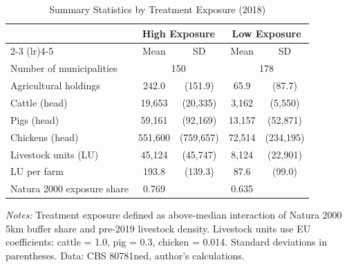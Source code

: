 \begin{table}[htbp]
\centering
\begin{threeparttable}
\caption{Summary Statistics by Treatment Exposure (2018)}
\label{tab:summary}
\small
\begin{tabular}{lcccc}
\toprule
 & \multicolumn{2}{c}{High Exposure} & \multicolumn{2}{c}{Low Exposure} \\
\cmidrule(lr){2-3} \cmidrule(lr){4-5}
 & Mean & SD & Mean & SD \\
\midrule
Number of municipalities & \multicolumn{2}{c}{150} & \multicolumn{2}{c}{178} \\
\addlinespace
Agricultural holdings & 242.0 & (151.9) & 65.9 & (87.7) \\
Cattle (head) & 19,653 & (20,335) & 3,162 & (5,550) \\
Pigs (head) & 59,161 & (92,169) & 13,157 & (52,871) \\
Chickens (head) & 551,600 & (759,657) & 72,514 & (234,195) \\
Livestock units (LU) & 45,124 & (45,747) & 8,124 & (22,901) \\
LU per farm & 193.8 & (139.3) & 87.6 & (99.0) \\
\addlinespace
Natura 2000 exposure share & 0.769 & & 0.635 & \\
\bottomrule
\end{tabular}
\begin{tablenotes}
\item \textit{Notes:} Treatment exposure defined as above-median interaction of Natura 2000 5km buffer share and pre-2019 livestock density. Livestock units use EU coefficients: cattle = 1.0, pig = 0.3, chicken = 0.014. Standard deviations in parentheses. Data: CBS 80781ned, author's calculations.
\end{tablenotes}
\end{threeparttable}
\end{table}
